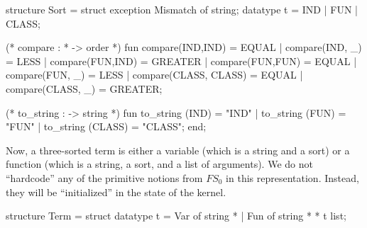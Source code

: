 \nwenddocs{}\endmoddef\nwstartdeflinemarkup\nwenddeflinemarkup
structure Sort = struct
exception Mismatch of string;
datatype t = IND | FUN | CLASS;

(* compare :  *  -> order *)
fun compare(IND,IND) = EQUAL
  | compare(IND, _) = LESS
  | compare(FUN,IND) = GREATER
  | compare(FUN,FUN) = EQUAL
  | compare(FUN, _) = LESS
  | compare(CLASS, CLASS) = EQUAL
  | compare(CLASS, _) = GREATER;

(* to_string :  -> string *)
fun to_string (IND) = "IND"
  | to_string (FUN) = "FUN"
  | to_string (CLASS) = "CLASS";
end;
\eatline
{}\nwendcode{}\nwdocspar
\begin{node}
Now, a three-sorted term is either a variable (which is a string and a
sort) or a function (which is a string, a sort, and a list of arguments).
We do not ``hardcode'' any of the primitive notions from $FS_{0}$ in
this representation. Instead, they will be ``initialized'' in the
state of the kernel.
\end{node}

\nwenddocs{}\endmoddef\nwstartdeflinemarkup\nwenddeflinemarkup
structure Term = struct
datatype t = Var of string * 
           | Fun of string *  * t list;


